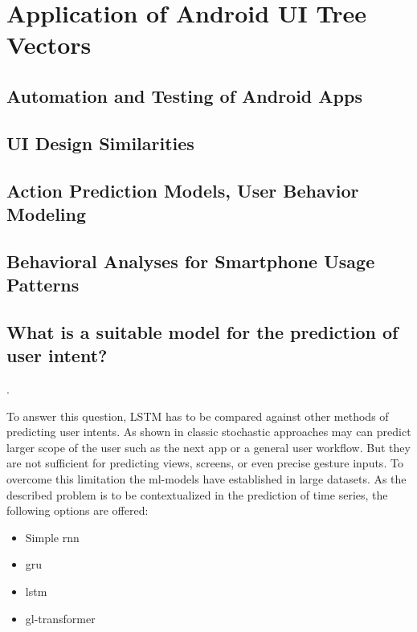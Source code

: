 \chapter{Application of Android UI Tree Vectors}

\section{Automation and Testing of Android Apps}
\section{UI Design Similarities}
\section{Action Prediction Models, User Behavior Modeling}
\section{Behavioral Analyses for Smartphone Usage Patterns}


\section{What is a suitable model for the prediction of user intent?}.

To answer this question, LSTM has to be compared against other methods of predicting user intents.
As shown in  classic stochastic approaches may can predict larger scope of the user such as the next app or a general user workflow.
But they are not sufficient for predicting views, screens, or even precise gesture inputs.
To overcome this limitation the \gls{ml}-models have established in large datasets.
As the described problem is to be contextualized in the prediction of time series, the following options are offered:
\begin{itemize}
    \item Simple \gls{rnn}
    \item \gls{gru}
    \item \gls{lstm}
    \item \gls{gl-transformer}
\end{itemize}

